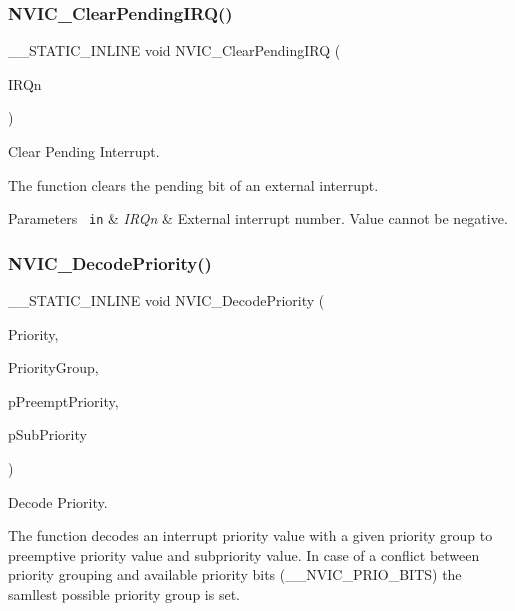 \subsubsection{\texorpdfstring{NVIC\_ClearPendingIRQ()}{NVIC\_ClearPendingIRQ()}}
{\footnotesize\ttfamily \+\_\+\+\_\+\+S\+T\+A\+T\+I\+C\+\_\+\+I\+N\+L\+I\+NE void N\+V\+I\+C\+\_\+\+Clear\+Pending\+I\+RQ (\begin{DoxyParamCaption}\item[{\mbox{\hyperlink{group___configuration__section__for___c_m_s_i_s_gac3af4a32370fb28c4ade8bf2add80251}{I\+R\+Qn\+\_\+\+Type}}}]{I\+R\+Qn }\end{DoxyParamCaption})}



Clear Pending Interrupt. 

The function clears the pending bit of an external interrupt.


\begin{DoxyParams}[1]{Parameters}
\mbox{\texttt{ in}}  & {\em I\+R\+Qn} & External interrupt number. Value cannot be negative. \\
\hline
\end{DoxyParams}
\mbox{\label{group___c_m_s_i_s___core___n_v_i_c_functions_ga4f23ef94633f75d3c97670a53949003c}} 
\subsubsection{\texorpdfstring{NVIC\_DecodePriority()}{NVIC\_DecodePriority()}}
{\footnotesize\ttfamily \+\_\+\+\_\+\+S\+T\+A\+T\+I\+C\+\_\+\+I\+N\+L\+I\+NE void N\+V\+I\+C\+\_\+\+Decode\+Priority (\begin{DoxyParamCaption}\item[{uint32\+\_\+t}]{Priority,  }\item[{uint32\+\_\+t}]{Priority\+Group,  }\item[{uint32\+\_\+t $\ast$}]{p\+Preempt\+Priority,  }\item[{uint32\+\_\+t $\ast$}]{p\+Sub\+Priority }\end{DoxyParamCaption})}



Decode Priority. 

The function decodes an interrupt priority value with a given priority group to preemptive priority value and subpriority value. In case of a conflict between priority grouping and available priority bits (\+\_\+\+\_\+\+N\+V\+I\+C\+\_\+\+P\+R\+I\+O\+\_\+\+B\+I\+TS) the samllest possible priority group is set.


